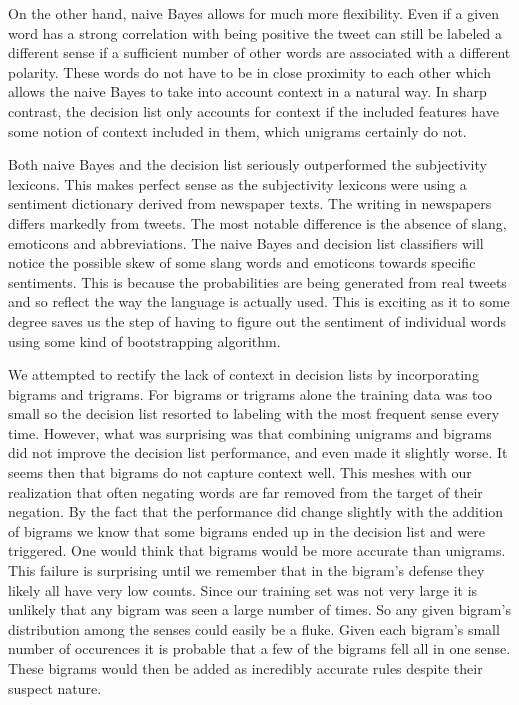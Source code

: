 \documentclass[11pt]{article}
\begin{document}
On the other hand, naive Bayes allows for much more flexibility. Even if a given word has a strong correlation with being positive the tweet can still be labeled a different sense if a sufficient number of other words are associated with a different polarity. These words do not have to be in close proximity to each other which allows the naive Bayes to take into account context in a natural way. In sharp contrast, the decision list only accounts for context if the included features have some notion of context included in them, which unigrams certainly do not.

Both naive Bayes and the decision list seriously outperformed the subjectivity lexicons. This makes perfect sense as the subjectivity lexicons were using a sentiment dictionary derived from newspaper texts. The writing in newspapers differs markedly from tweets. The most notable difference is the absence of slang, emoticons and abbreviations. The naive Bayes and decision list classifiers will notice the possible skew of some slang words and emoticons towards specific sentiments. This is because the probabilities are being generated from real tweets and so reflect the way the language is actually used. This is exciting as it to some degree saves us the step of having to figure out the sentiment of individual words using some kind of bootstrapping algorithm.

We attempted to rectify the lack of context in decision lists by incorporating bigrams and trigrams. For bigrams or trigrams alone the training data was too small so the decision list resorted to labeling with the most frequent sense every time. However, what was surprising was that combining unigrams and bigrams did not improve the decision list performance, and even made it slightly worse. It seems then that bigrams do not capture context well. This meshes with our realization that often negating words are far removed from the target of their negation. By the fact that the performance did change slightly with the addition of bigrams we know that some bigrams ended up in the decision list and were triggered. One would think that bigrams would be more accurate than unigrams. This failure is surprising until we remember that in the bigram's defense they likely all have very low counts. Since our training set was not very large it is unlikely that any bigram was seen a large number of times. So any given bigram's distribution among the senses could easily be a fluke. Given each bigram's small number of occurences it is probable that a few of the bigrams fell all in one sense. These bigrams would then be added as incredibly accurate rules despite their suspect nature.
\end{document}
